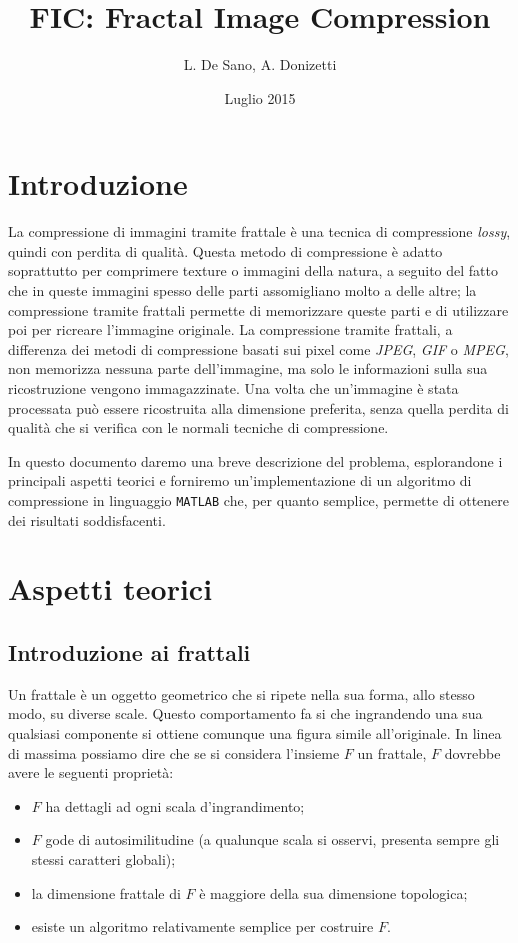 \documentclass[11pt,a4paper]{scrreprt}
\author{L. De Sano, A. Donizetti}
\title{\textsc{FIC}: Fractal Image Compression}
\date{Luglio 2015}
\begin{document}
\maketitle

\tableofcontents

\chapter{Introduzione}

La compressione di immagini tramite frattale è una tecnica di compressione \textit{lossy}, quindi con perdita di qualità. Questa metodo di compressione è adatto soprattutto per comprimere texture o immagini della natura, a seguito del fatto che in queste immagini spesso delle parti assomigliano molto a delle altre; la compressione tramite frattali permette di memorizzare queste parti e di utilizzare poi per ricreare l'immagine originale. La compressione tramite frattali, a differenza dei metodi di compressione basati sui pixel come \textit{JPEG}, \textit{GIF} o \textit{MPEG}, non memorizza nessuna parte dell'immagine, ma solo le informazioni sulla sua ricostruzione vengono immagazzinate. Una volta che un'immagine è stata processata può essere ricostruita alla dimensione preferita, senza quella perdita di qualità che si verifica con le normali tecniche di compressione.

In questo documento daremo una breve descrizione del problema, esplorandone i principali aspetti teorici e forniremo un'implementazione di un algoritmo di compressione in linguaggio \texttt{MATLAB} che, per quanto semplice, permette di ottenere dei risultati soddisfacenti.

\chapter{Aspetti teorici}

\section{Introduzione ai frattali}

Un frattale è un oggetto geometrico che si ripete nella sua forma, allo stesso modo, su diverse scale. Questo comportamento fa si che ingrandendo una sua qualsiasi componente si ottiene comunque una figura simile all'originale. In linea di massima possiamo dire che se si considera l'insieme $F$ un frattale, $F$ dovrebbe avere le seguenti proprietà:

\begin{itemize}
\item $F$ ha dettagli ad ogni scala d'ingrandimento;
\item $F$ gode di autosimilitudine (a qualunque scala si osservi, presenta sempre gli stessi caratteri globali);
\item la dimensione frattale di $F$ è maggiore della sua dimensione topologica;
\item esiste un algoritmo relativamente semplice per costruire $F$.
\end{itemize}
\end{document}

